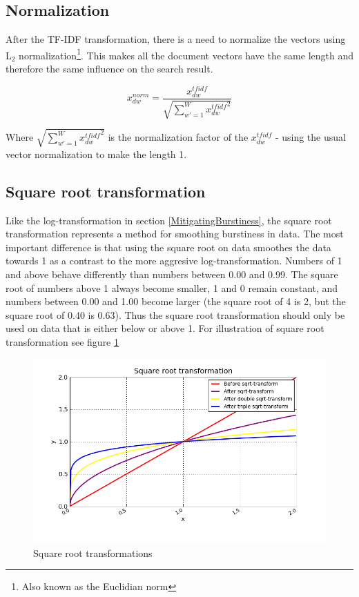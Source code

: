 \subsection{Normalization} 

After the TF-IDF transformation, there is a need to normalize the
vectors using L$_2$ normalization\footnote{Also known as the
  Euclidian norm}. This makes all the document vectors have the same
length and therefore the same influence on the search result.

\[
x_{dw}^{norm} = \frac{x_{dw}^{tfidf}}{\sqrt{\sum_{w\prime = 1}^{W} {x_{dw}^{tfidf}}^{2}}}
\]

Where $\sqrt{\sum_{w\prime = 1}^{W} {x_{dw}^{tfidf}}^{2}}$ is the
normalization factor of the $x_{dw}^{tfidf}$ - using the usual vector
normalization to make the length 1.

\subsection{Square root transformation\label{SquareRoot}}

Like the log-transformation in section \ref{MitigatingBurstiness}, the
square root transformation represents a method for smoothing
burstiness in data. The most important difference is that using the
square root on data smoothes the data towards 1 as a contrast to the
more aggresive log-transformation. Numbers of 1 and above behave
differently than numbers between 0.00 and 0.99. The square root of
numbers above 1 always become smaller, 1 and 0 remain constant, and
numbers between 0.00 and 1.00 become larger (the square root of 4 is
2, but the square root of 0.40 is 0.63). Thus the square root
transformation should only be used on data that is either below or
above 1. For illustration of square root transformation see figure
\ref{SqrtTransformations}

\begin{figure}[H]
        \begin{center}
          \includegraphics[width=1.0\textwidth]{barcharts/sqrt_graph.png}
        \end{center}
        \caption{Square root transformations}
        \label{SqrtTransformations}
\end{figure}

